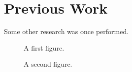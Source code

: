 \chapter{Previous Work}

Some other research was once performed.

\begin{figure}
\caption{A first figure.}
\end{figure}

\begin{figure}
\caption{A second figure.}
\end{figure}